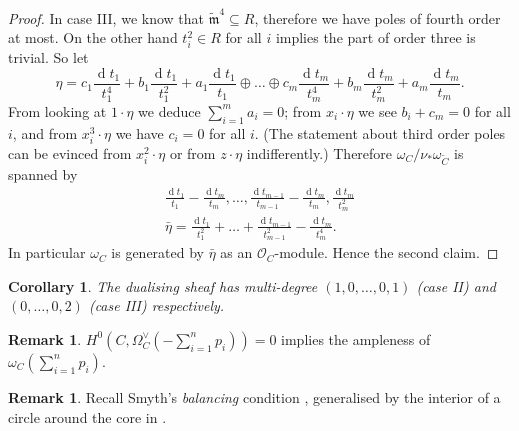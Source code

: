 \documentclass[11pt]{amsart}
\newcommand{\tm}{\widetilde{\mathfrak m}}
\newcommand{\OO}{\mathcal O}
\theoremstyle{plain}
\newtheorem{cor}[thm]{Corollary}
\theoremstyle{definition}
\newtheorem{rem}[thm]{Remark}
\begin{document}
\begin{proof}
In case III, we know that $\tm^4\subseteq R$, therefore we have poles of fourth order at most. On the other hand $t_i^2\in R$ for all $i$ implies the part of order three is trivial. So let \[\eta=c_1\frac{\operatorname{d}t_1}{t_1^4}+b_1\frac{\operatorname{d}t_1}{t_1^2}+a_1\frac{\operatorname{d}t_1}{t_1}\oplus\ldots\oplus c_m\frac{\operatorname{d}t_m}{t_m^4}+b_m\frac{\operatorname{d}t_m}{t_m^2}+a_m\frac{\operatorname{d}t_m}{t_m}.\]
 From looking at $1\cdot\eta$ we deduce $\sum_{i=1}^m a_i=0$; from $x_i\cdot\eta$ we see $b_i+c_m=0$ for all $i$, and from $x_i^3\cdot\eta$ we have $c_i=0$ for all $i$. (The statement about third order poles can be evinced from $x_i^2\cdot\eta$ or from $z\cdot\eta$ indifferently.) Therefore $\omega_C/\nu_*\omega_{\tilde C}$ is spanned by
 \begin{align*}
  \frac{\operatorname{d}t_1}{t_1}-\frac{\operatorname{d}t_m}{t_m},\ldots,\frac{\operatorname{d}t_{m-1}}{t_{m-1}}-\frac{\operatorname{d}t_m}{t_m},\frac{\operatorname{d}t_m}{t_m^2}\\
  \bar{\eta}=\frac{\operatorname{d}t_1}{t_1^2}+\ldots+\frac{\operatorname{d}t_{m-1}}{t_{m-1}^2}-\frac{\operatorname{d}t_m}{t_m^4}.
 \end{align*}
In particular $\omega_C$ is generated by $\bar{\eta}$ as an $\OO_C$-module. Hence the second claim.
\end{proof}

\begin{cor}
 The dualising sheaf has multi-degree $(1,0,\ldots,0,1)$ (case II) and $(0,\ldots,0,2)$ (case III) respectively.
\end{cor}

\begin{rem}
 $H^0(C,\Omega_C^\vee(-\sum_{i=1}^np_i))=0$ implies the ampleness of $\omega_C(\sum_{i=1}^np_i)$.
\end{rem}

\begin{rem}
 Recall Smyth's \emph{balancing} condition \cite[Definition 2.11]{SMY1}, generalised by the interior of a circle around the core in \cite{RSPW1}.
\end{rem}
\end{document}
